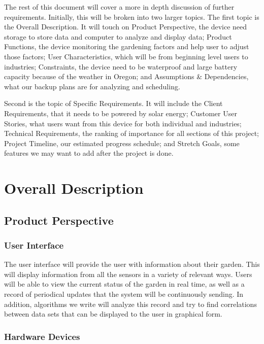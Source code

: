 \documentclass[IEEEtran,letterpaper,10pt,titlepage,fleqn,draftclsnofoot,onecolumn]{article}
\begin{document}
The rest of this document will cover a more in depth discussion of further requirements. Initially, this will be broken into two larger topics. The first topic is the Overall Description. It will touch on Product Perspective, the device need storage to store data and computer to analyze and display data; Product Functions, the device monitoring the gardening factors and help user to adjust those factors; User Characteristics, which will be from beginning level users to industries; Constraints, the device need to be waterproof and large battery capacity because of the weather in Oregon; and Assumptions \& Dependencies, what our backup plans are for analyzing and scheduling.

\vspace{5mm}

Second is the topic of Specific Requirements. It will include the Client Requirements, that it needs to be powered by solar energy; Customer User Stories, what users want from this device for both individual and industries; Technical Requirements, the ranking of importance for all sections of this project; Project Timeline, our estimated progress schedule; and Stretch Goals, some features we may want to add after the project is done. 

\section{Overall Description}
\subsection{Product Perspective}
\subsubsection{User Interface}

The user interface will provide the user with information about their garden. This will display information from all the sensors in a variety of relevant ways. Users will be able to view the current status of the garden in real time, as well as a record of periodical updates that the system will be continuously sending. In addition, algorithms we write will analyze this record and try to find correlations between data sets that can be displayed to the user in graphical form.   

\subsubsection{Hardware Devices}
\end{document}

